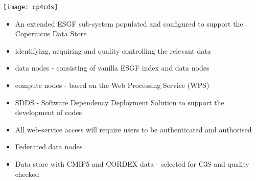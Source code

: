 \documentclass[portrait,a0paper,fontscale=0.4]{baposter} %
\newcommand{\compresslist}{%
\setlength{\itemsep}{1pt}%
\setlength{\parskip}{0pt}%
\setlength{\parsep}{0pt}%
}
\begin{document}
\begin{poster}
{   \begin{minipage}{0.4\textwidth}
     \texttt{[image: cp4cds]}
   \end{minipage}
   \begin{minipage}{0.6\textwidth}
     \begin{itemize}\compresslist
       \item An extended ESGF sub-system populated and configured to support the Copernicus Data Store
       \item identifying, acquiring and quality controlling the relevant data
       \item data nodes - consisting of vanilla ESGF index and data nodes
       \item compute nodes - based on the Web Processing Service (WPS)
       \item SDDS - Software Dependency Deployment Solution to support the development of codes
       \item All web-service access will require users to be authenticated and authorised
       \item Federated data nodes
       \item Data store with CMIP5 and CORDEX data - selected for C3S and quality checked
     \end{itemize}
    \end{minipage}
 }


\end{poster}
\end{document}
